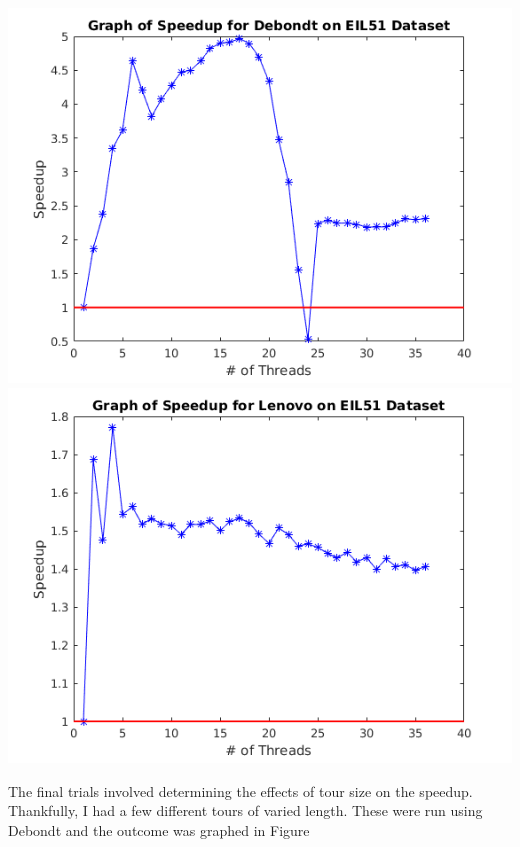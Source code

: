 \documentclass[10pt,letterpaper]{article}
\begin{document}
\includegraphics[scale=1]{../img/Debondt_speedup.png} 
\includegraphics[scale=1]{../img/Lenovo_Speedup.png} 


The final trials involved determining the effects of tour size on the speedup. Thankfully, I had a few different tours of varied length. These were run using Debondt and the outcome was graphed in Figure %

\end{document}
